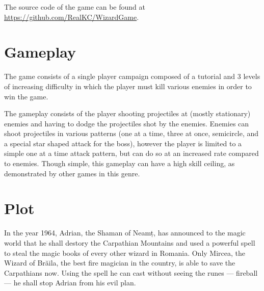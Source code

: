 \documentclass{article}
\begin{document}
    The source code of the game can be found at \url{https://github.com/RealKC/WizardGame}.

    \section{Gameplay}

    The game consists of a single player campaign composed of a tutorial and 3 levels of increasing
    difficulty in which the player must kill various enemies in order to win the game.

    The gameplay consists of the player shooting projectiles at (mostly stationary) enemies and having
    to dodge the projectiles shot by the enemies. Enemies can shoot projectiles in various patterns
    (one at a time, three at once, semicircle, and a special star shaped attack for the boss), however
    the player is limited to a simple one at a time attack pattern, but can do so at an increased rate
    compared to enemies. Though simple, this gameplay can have a high skill ceiling, as demonstrated
    by other games in this genre.

    \section{Plot}

    In the year 1964, Adrian, the Shaman of Neamț, has announced to the magic world that he
    shall destory the Carpathian Mountains and used a powerful spell to steal the magic books of
    every other wizard in Romania. Only Mircea, the Wizard of Brăila, the best fire magician in the
    country, is able to save the Carpathians now. Using the spell he can cast without seeing the
    runes --- fireball --- he shall stop Adrian from his evil plan.
\end{document}
